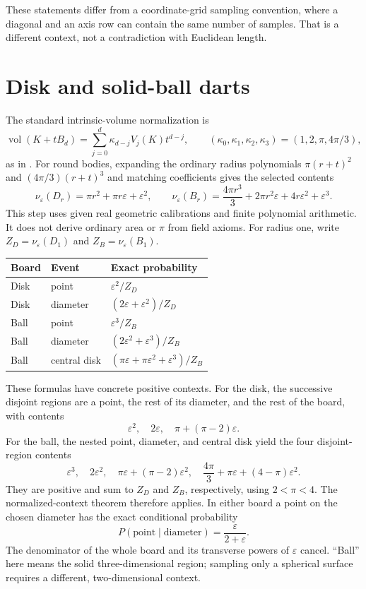 \documentclass[11pt]{article}
\theoremstyle{definition}
\theoremstyle{remark}
\newcommand{\eps}{\varepsilon}
\newcommand{\vol}{\operatorname{vol}}
\newcommand{\nuE}{\nu_{\eps}}
\begin{document}
These statements differ from a coordinate-grid sampling convention,
where a diagonal and an axis row can contain the same number of samples.
That is a different context, not a contradiction with Euclidean length.

\section{Disk and solid-ball darts}
The standard intrinsic-volume normalization is
\[
 \vol(K+tB_d)=\sum_{j=0}^d\kappa_{d-j}V_j(K)t^{d-j},
 \qquad(\kappa_0,\kappa_1,\kappa_2,\kappa_3)
       =(1,2,\pi,4\pi/3),
\]
as in \cite{steiner}. For round bodies, expanding the ordinary radius
polynomials $\pi(r+t)^2$ and $(4\pi/3)(r+t)^3$ and matching coefficients
gives the selected contents
\[
 \nuE(D_r)=\pi r^2+\pi r\eps+\eps^2,\qquad
 \nuE(B_r)=\frac{4\pi r^3}{3}+2\pi r^2\eps+4r\eps^2+\eps^3.
\]
This step uses given real geometric calibrations and finite polynomial
arithmetic. It does not derive ordinary area or $\pi$ from field axioms.
For radius one, write $Z_D=\nuE(D_1)$ and $Z_B=\nuE(B_1)$.
\begin{center}
\begin{tabular}{lll}
\toprule
Board & Event & Exact probability \\
\midrule
Disk & point & $\eps^2/Z_D$ \\
Disk & diameter & $(2\eps+\eps^2)/Z_D$ \\
Ball & point & $\eps^3/Z_B$ \\
Ball & diameter & $(2\eps^2+\eps^3)/Z_B$ \\
Ball & central disk & $(\pi\eps+\pi\eps^2+\eps^3)/Z_B$ \\
\bottomrule
\end{tabular}
\end{center}

These formulas have concrete positive contexts. For the disk, the
successive disjoint regions are a point, the rest of its diameter, and
the rest of the board, with contents
\[
 \eps^2,\quad 2\eps,\quad \pi+(\pi-2)\eps.
\]
For the ball, the nested point, diameter, and central disk yield the
four disjoint-region contents
\[
 \eps^3,\quad 2\eps^2,\quad
 \pi\eps+(\pi-2)\eps^2,\quad
 \frac{4\pi}{3}+\pi\eps+(4-\pi)\eps^2.
\]
They are positive and sum to $Z_D$ and $Z_B$, respectively, using
$2<\pi<4$. The normalized-context theorem therefore applies. In either
board a point on the chosen diameter has the exact conditional probability
\begin{equation}\label{eq:conditional}
 P(\text{point}\mid\text{diameter})=\frac{\eps}{2+\eps}.
\end{equation}
The denominator of the whole board and its transverse powers of $\eps$
cancel. ``Ball'' here means the solid three-dimensional region; sampling
only a spherical surface requires a different, two-dimensional context.
\end{document}
